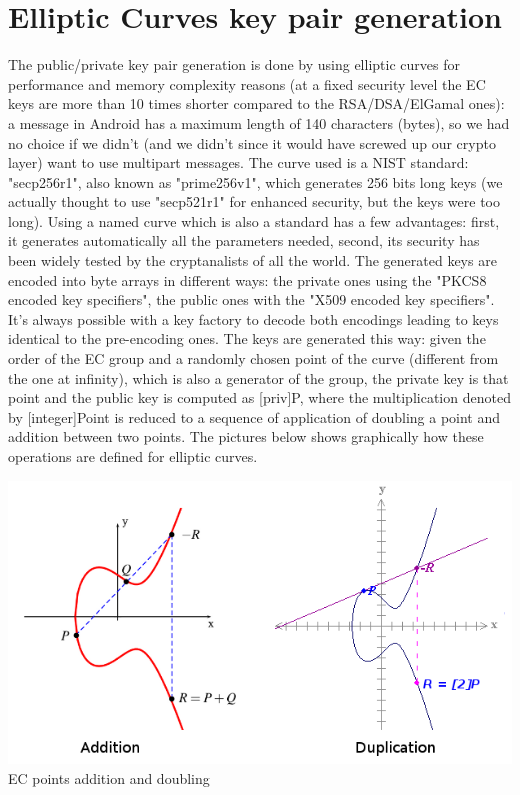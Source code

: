 \section{Elliptic Curves key pair generation}
The public/private key pair generation is done by using elliptic curves for performance and memory complexity reasons (at a fixed security level the EC keys are more than 10 times shorter compared to the RSA/DSA/ElGamal ones): a message in Android has a maximum length of 140 characters (bytes), so we had no choice if we didn't (and we didn't since it would have screwed up our crypto layer) want to use multipart messages. The curve used is a NIST standard: "secp256r1", also known as "prime256v1", which generates 256 bits long keys (we actually thought to use "secp521r1" for enhanced security, but the keys were too long). Using a named curve which is also a standard has a few advantages: first, it generates automatically all the parameters needed, second, its security has been widely tested by the cryptanalists of all the world. The generated keys are encoded into byte arrays in different ways: the private ones using the "PKCS8 encoded key specifiers", the public ones with the "X509 encoded key specifiers". It's always possible with a key factory to decode both encodings leading to keys identical to the pre-encoding ones. The keys are generated this way: given the order of the EC group and a randomly chosen point of the curve (different from the one at infinity), which is also a generator of the group, the private key is that point and the public key is computed as [priv]P, where the multiplication denoted by [integer]Point is reduced to a sequence of application of doubling a point and addition between two points. The pictures below shows graphically how these operations are defined for elliptic curves.\\

\vspace{1cm}
\begin{center}
\includegraphics[scale=0.5]{images/ec}\\

\vspace{1cm}
EC points addition and doubling\\
\end{center}